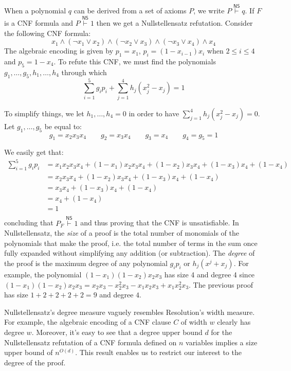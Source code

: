 \noindent
When a polynomial $q$ can be derived from a set of axioms $P$, we write $P \stackrel{\mathsf{NS}}{\vdash} q$. If $F$ is a CNF formula and $P \stackrel{\mathsf{NS}}{\vdash} 1$ then we get a Nullstellensatz refutation. 
Consider the following CNF formula:
\[x_1 \land (\lnot x_1 \lor x_2) \land (\lnot x_2 \lor x_3) \land (\lnot x_3 \lor x_4)\land x_4\]
The algebraic encoding is given by $p_1 = x_1$, $p_i = (1-x_{i-1})x_i$ when $2 \leq i \leq 4$ and $p_5 = 1-x_4$. To refute this CNF, we must find the polynomials $g_1, \ldots, g_5, h_1, \ldots, h_4$ through which
\[\sum_{i = 1}^5 g_ip_{i} + \sum_{j = 1}^4 h_j(x_j^2-x_j) = 1\]

\noindent
To simplify things, we let $h_1, \ldots, h_4 = 0$ in order to have $\sum_{j = 1}^4 h_j(x_j^2-x_j) = 0$. Let $g_1, \ldots, g_5$ be equal to:
\[g_1 = x_2x_3x_4 \qquad g_2 = x_3x_4 \qquad g_3 = x_4 \qquad g_4 = g_5 = 1\]

\noindent
We easily get that:
\[\begin{split}
    \sum_{i = 1}^5 g_ip_{i}&= x_1x_2x_3x_4 + (1-x_1)x_2x_3x_4 + (1-x_2)x_3x_4 + (1-x_3)x_4 + (1-x_4)\\
    &= x_2x_3x_4 + (1-x_2)x_3x_4 + (1-x_3)x_4 + (1-x_4)\\
    &= x_3x_4 + (1-x_3)x_4 + (1-x_4)\\
    &= x_4 + (1-x_4)\\
    &= 1\\
\end{split}\]
concluding that $P_F \stackrel{\mathsf{NS}}{\vdash} 1$ and thus proving that the CNF is unsatisfiable. In Nullstellensatz, the \textit{size} of a proof is the total number of monomials of the polynomials that make the proof, i.e. the total number of terms in the sum once fully expanded without simplifying any addition (or subtraction). The \textit{degree} of the proof is the maximum degree of any polynomial $g_ip_i$ or $h_j(x^j+x_j)$. For example, the polynomial $(1-x_1)(1-x_2)x_2x_3$ has size 4 and degree 4 since $(1-x_1)(1-x_2)x_2x_3 = x_2x_3 - x_2^2x_3 - x_1x_2x_3 + x_1x_2^2x_3$. The previous proof has size $1+2+2+2+2 = 9$ and degree $4$.

Nullstellensatz's degree measure vaguely resembles Resolution's width measure. For example, the algebraic encoding of a CNF clause $C$ of width $w$ clearly has degree $w$. Moreover, it's easy to see that a degree upper bound $d$ for the Nullstellensatz refutation of a CNF formula defined on $n$ variables implies a size upper bound of $n^{O(d)}$. This result enables us to restrict our interest to the degree of the proof.

